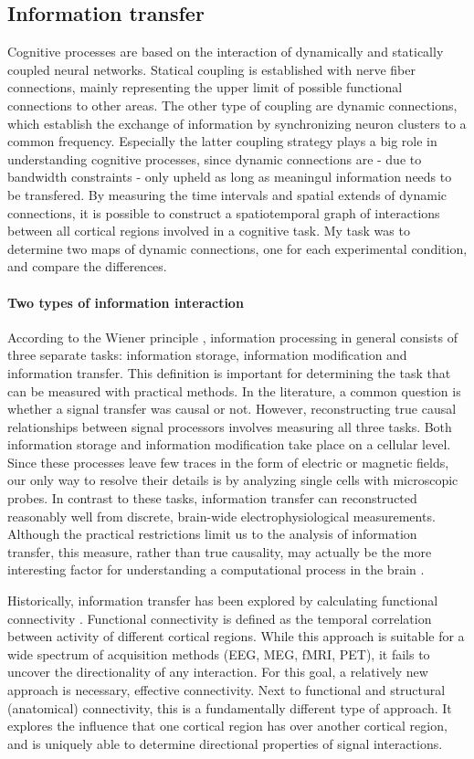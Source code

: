 \subsection{Information transfer}
Cognitive processes are based on the interaction of dynamically and statically coupled neural networks.
Statical coupling is established with nerve fiber connections, mainly representing the upper limit of possible functional connections to other areas.
The other type of coupling are dynamic connections, which establish the exchange of information by synchronizing neuron clusters to a common frequency.
Especially the latter coupling strategy plays a big role in understanding cognitive processes, since dynamic connections are - due to bandwidth constraints - only upheld as long as meaningul information needs to be transfered.
By measuring the time intervals and spatial extends of dynamic connections, it is possible to construct a spatiotemporal graph of interactions between all cortical regions involved in a cognitive task.
My task was to determine two maps of dynamic connections, one for each experimental condition, and compare the differences.

\paragraph{Two types of information interaction}
According to the Wiener principle \cite{1.5.information}, information processing in general consists of three separate tasks: information storage, information modification and information transfer.
This definition is important for determining the task that can be measured with practical methods.
In the literature, a common question is whether a signal transfer was causal or not.
However, reconstructing true causal relationships between signal processors involves measuring all three tasks.
Both information storage and information modification take place on a cellular level.
Since these processes leave few traces in the form of electric or magnetic fields, our only way to resolve their details is by analyzing single cells with microscopic probes.
In contrast to these tasks, information transfer can reconstructed reasonably well from discrete, brain-wide electrophysiological measurements.
Although the practical restrictions limit us to the analysis of information transfer, this measure, rather than true causality, may actually be the more interesting factor for understanding a computational process in the brain \cite{1.5.causality}.

Historically, information transfer has been explored by calculating functional connectivity \cite{1.5.connectivity}.
Functional connectivity is defined as the temporal correlation between activity of different cortical regions.
While this approach is suitable for a wide spectrum of acquisition methods (EEG, MEG, fMRI, PET), it fails to uncover the directionality of any interaction.
For this goal, a relatively new approach is necessary, effective connectivity.
Next to functional and structural (anatomical) connectivity, this is a fundamentally different type of approach.
It explores the influence that one cortical region has over another cortical region, and is uniquely able to determine directional properties of signal interactions.

